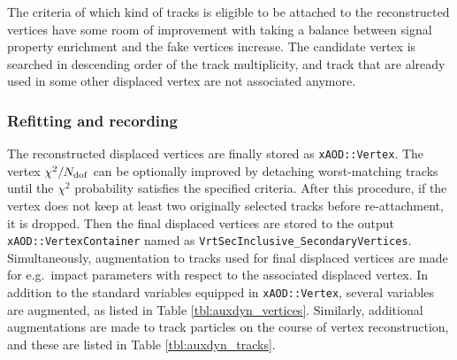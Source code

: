 The criteria of which kind of tracks is eligible to be attached to the reconstructed vertices have some room of improvement with taking a balance between signal property enrichment and the fake vertices increase. The candidate vertex is searched in descending order of the track multiplicity, and track that are already used in some other displaced vertex are not associated anymore.



\subsubsection{Refitting and recording}
The reconstructed displaced vertices are finally stored as {\tt xAOD::Vertex}. The vertex $\chi^{2}/N_{\rm dof}$ can be optionally improved by detaching worst-matching tracks until the $\chi^{2}$ probability satisfies the specified criteria. After this procedure, if the vertex does not keep at least two originally selected tracks before re-attachment, it is dropped. Then the final displaced vertices are stored to the output {\tt xAOD::VertexContainer} named as {\tt VrtSecInclusive\_SecondaryVertices}. Simultaneously, augmentation to tracks used for final displaced vertices are made for e.g.~impact parameters with respect to the associated displaced vertex. In addition to the standard variables equipped in {\tt xAOD::Vertex}, several variables are augmented, as listed in Table \ref{tbl:auxdyn_vertices}. Similarly, additional augmentations are made to track particles on the course of vertex reconstruction, and these are listed in Table \ref{tbl:auxdyn_tracks}.

